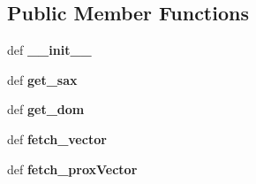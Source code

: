 \subsection*{Public Member Functions}
\begin{DoxyCompactItemize}
\item 
\hypertarget{classcheshire3_1_1record_1_1_dom_record_aaef873541795e85647e4798b4c1668cf}{def {\bfseries \-\_\-\-\_\-init\-\_\-\-\_\-}}\label{classcheshire3_1_1record_1_1_dom_record_aaef873541795e85647e4798b4c1668cf}

\item 
\hypertarget{classcheshire3_1_1record_1_1_dom_record_a15b3c3b5a8ccf6848b7f1fdd2a3acc6c}{def {\bfseries get\-\_\-sax}}\label{classcheshire3_1_1record_1_1_dom_record_a15b3c3b5a8ccf6848b7f1fdd2a3acc6c}

\item 
\hypertarget{classcheshire3_1_1record_1_1_dom_record_afe19171f45a4ae317b4f52461d1c4df0}{def {\bfseries get\-\_\-dom}}\label{classcheshire3_1_1record_1_1_dom_record_afe19171f45a4ae317b4f52461d1c4df0}

\item 
\hypertarget{classcheshire3_1_1record_1_1_dom_record_ab8f2373031e5fd083567431dc2697c39}{def {\bfseries fetch\-\_\-vector}}\label{classcheshire3_1_1record_1_1_dom_record_ab8f2373031e5fd083567431dc2697c39}

\item 
\hypertarget{classcheshire3_1_1record_1_1_dom_record_a26bb1ac21ee1aee2f17556b1d9e5d587}{def {\bfseries fetch\-\_\-prox\-Vector}}\label{classcheshire3_1_1record_1_1_dom_record_a26bb1ac21ee1aee2f17556b1d9e5d587}

\end{DoxyCompactItemize}
